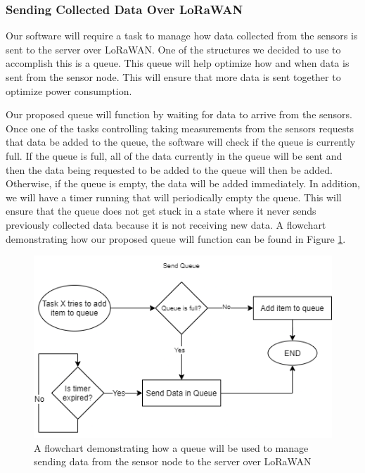 \subsubsection{Sending Collected Data Over LoRaWAN}
Our software will require a task to manage how data collected from the sensors is sent to the server over LoRaWAN. One of the structures we decided to use to accomplish this is a queue. This queue will help optimize how and when data is sent from the sensor node. This will ensure that more data is sent together to optimize power consumption.

Our proposed queue will function by waiting for data to arrive from the sensors. Once one of the tasks controlling taking measurements from the sensors requests that data be added to the queue, the software will check if the queue is currently full. If the queue is full, all of the data currently in the queue will be sent and then the data being requested to be added to the queue will then be added. Otherwise, if the queue is empty, the data will be added immediately. In addition, we will have a timer running that will periodically empty the queue. This will ensure that the queue does not get stuck in a state where it never sends previously collected data because it is not receiving new data. A flowchart demonstrating how our proposed queue will function can be found in Figure \ref{fig:queue-diagram}.

\begin{figure}[H]
    \centering
    \includegraphics[width=6in]{figures/queue-diagram.png}
    \caption{A flowchart demonstrating how a queue will be used to manage sending data from the sensor node to the server over LoRaWAN}
    \label{fig:queue-diagram} 
\end{figure}